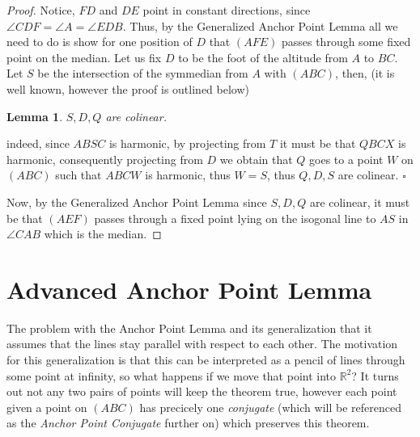 \documentclass{article}
\newtheorem{lemma}{Lemma}
\begin{document}
\begin{proof}
  Notice, \(FD\) and \(DE\) point in constant directions, since \(\angle{CDF} = \angle{A} = \angle{EDB}\). Thus, by the Generalized Anchor Point Lemma all we need to do is show for one position of \(D\) that \((AFE)\) passes through some fixed point on the median. Let us fix \(D\) to be the foot of the altitude from \(A\) to \(BC\). Let \(S\) be the intersection of the symmedian from \(A\) with \((ABC)\), then, (it is well known, however the proof is outlined below)
  \begin{lemma}
    \(S, D, Q\) are colinear.
  \end{lemma}
  indeed, since \(ABSC\) is harmonic, by projecting from \(T\) it must be that \(QBCX\) is harmonic, consequently projecting from \(D\) we obtain that \(Q\) goes to a point \(W\) on \((ABC)\) such that \(ABCW\) is harmonic, thus \(W = S\), thus \(Q, D, S\) are colinear. \(\square\)

  Now, by the Generalized Anchor Point Lemma since \(S, D, Q\) are colinear, it must be that \((AEF)\) passes through a fixed point lying on the isogonal line to \(AS\) in \(\angle{CAB}\) which is the median.
\end{proof}

\section{Advanced Anchor Point Lemma}

The problem with the Anchor Point Lemma and its generalization that it assumes that the lines stay parallel with respect to each other. The motivation for this generalization is that this can be interpreted as a pencil of lines through some point at infinity, so what happens if we move that point into \(\mathbb{R}^2\)? It turns out not any two pairs of points will keep the theorem true, however each point given a point on \((ABC)\) has precicely one \textit{conjugate} (which will be referenced as the \textit{Anchor Point Conjugate} further on) which preserves this theorem.
\end{document}
